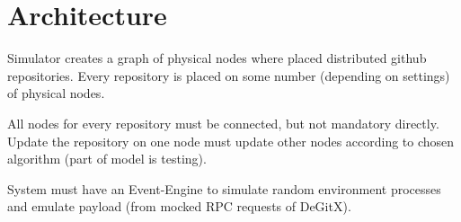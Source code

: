 \documentclass[12pt,oneside]{article}
\begin{document}
                      \section{Architecture}
                      \label{sec:arch}

                      Simulator creates a graph of physical nodes where placed distributed github repositories. Every repository is placed on some number (depending on settings) of physical nodes.

                      All nodes for every repository must be connected, but not mandatory directly. Update the repository on one node must update other nodes according to chosen algorithm (part of model is testing).

                      System must have an Event-Engine to simulate random environment processes and emulate payload (from mocked RPC requests of DeGitX).
\end{document}
